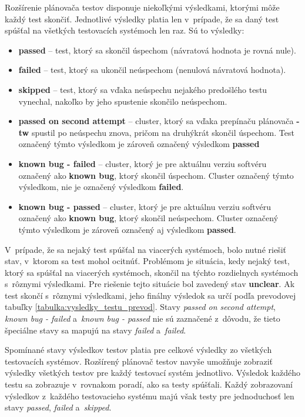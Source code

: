 Rozšírenie plánovača testov disponuje niekoľkými výsledkami, ktorými 
môže každý test skončiť. Jednotlivé výsledky platia len v~prípade, že 
sa daný test spúšťal na všetkých testovacích systémoch len raz. 
Sú to výsledky:
\begin{itemize}
\item \textbf{passed} -- test, ktorý sa skončil úspechom 
(návratová hodnota je rovná nule).
\item \textbf{failed} -- test, ktorý sa ukončil neúspechom 
(nenulová návratová hodnota).
\item \textbf{skipped} -- test, ktorý sa vďaka neúspechu nejakého predošlého 
testu vynechal, nakoľko by jeho spustenie skončilo neúspechom.
\item \textbf{passed on second attempt} -- cluster, ktorý sa vďaka 
prepínaču plánovača \textbf{-tw} spustil po neúspechu znova, pričom na 
druhýkrát skončil úspechom. 
Test označený týmto výsledkom je zároveň označený výsledkom \textbf{passed}
\item \textbf{known bug - failed} -- cluster, ktorý je pre aktuálnu 
verziu softvéru označený ako \textbf{known bug}, ktorý skončil úspechom. 
Cluster označený týmto výsledkom, nie je označený výsledkom \textbf{failed}.
\item \textbf{known bug - passed} -- cluster, ktorý je pre aktuálnu 
verziu softvéru označený ako \textbf{known bug}, ktorý skončil neúspechom.
Cluster označený týmto výsledkom je zároveň označený aj výsledkom 
\textbf{passed}.
\end{itemize} 

V~prípade, že sa nejaký test spúšťal na viacerých systémoch, bolo nutné 
riešiť stav, v~ktorom sa test mohol ocitnúť. Problémom je situácia, 
kedy nejaký test, ktorý sa spúšťal na viacerých systémoch, skončil na 
týchto rozdielnych systémoch s~rôznymi výsledkami.
Pre riešenie tejto situácie bol zavedený stav \textbf{unclear}. 
Ak test skončí s~rôznymi výsledkami, jeho finálny výsledok sa určí podľa 
prevodovej tabuľky \ref{tabulka:vysledky_testu_prevod}.
Stavy \emph{passed on second attempt}, \emph{known bug - failed}
a~\emph{known bug - passed} nie sú zaznačené z~dôvodu, že tieto špeciálne 
stavy sa mapujú na stavy \emph{failed} a~\emph{failed}.

Spomínané stavy výsledkov testov platia pre celkové výsledky zo všetkých 
testovacích systémov. Rozšírený plánovač testov navyše umožňuje zobraziť 
výsledky všetkých testov pre každý testovací systém jednotlivo. 
Výsledok každého testu sa zobrazuje v~rovnakom poradí, ako sa testy spúšťali.
Každý zobrazovaní výsledkov z~každého testovacieho systému majú však 
testy pre jednoduchosť len stavy \emph{passed}, \emph{failed} 
a~\emph{skipped}. 

